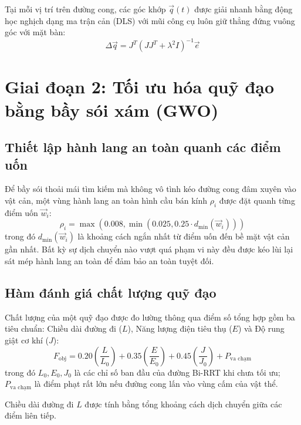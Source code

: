 Tại mỗi vị trí trên đường cong, các góc khớp $\vec{q}(t)$ được giải nhanh bằng động học nghịch dạng ma trận cản (DLS) với mũi công cụ luôn giữ thẳng đứng vuông góc với mặt bàn:
\begin{equation}
    \Delta \vec{q} = J^T \left( J J^T + \lambda^2 I \right)^{-1} \vec{e}
\end{equation}

\section{Giai đoạn 2: Tối ưu hóa quỹ đạo bằng bầy sói xám (GWO)}
\label{sec:stage2_gwo}

\subsection{Thiết lập hành lang an toàn quanh các điểm uốn}

Để bầy sói thoải mái tìm kiếm mà không vô tình kéo đường cong đâm xuyên vào vật cản, một vùng hành lang an toàn hình cầu bán kính $\rho_i$ được đặt quanh từng điểm uốn $\vec{w}_i$:
\begin{equation}
    \rho_i = \max\left( 0.008, \min\left( 0.025, 0.25 \cdot d_{\min}(\vec{w}_i) \right) \right)
\end{equation}
trong đó $d_{\min}(\vec{w}_i)$ là khoảng cách ngắn nhất từ điểm uốn đến bề mặt vật cản gần nhất. Bất kỳ sự dịch chuyển nào vượt quá phạm vi này đều được kéo lùi lại sát mép hành lang an toàn để đảm bảo an toàn tuyệt đối.

\subsection{Hàm đánh giá chất lượng quỹ đạo}

Chất lượng của một quỹ đạo được đo lường thông qua điểm số tổng hợp gồm ba tiêu chuẩn: Chiều dài đường đi ($L$), Năng lượng điện tiêu thụ ($E$) và Độ rung giật cơ khí ($J$):
\begin{equation}
    F_{\text{obj}} = 0.20 \left(\frac{L}{L_0}\right) + 0.35 \left(\frac{E}{E_0}\right) + 0.45 \left(\frac{J}{J_0}\right) + P_{\text{va chạm}}
\end{equation}
trong đó $L_0, E_0, J_0$ là các chỉ số ban đầu của đường Bi-RRT khi chưa tối ưu; $P_{\text{va chạm}}$ là điểm phạt rất lớn nếu đường cong lấn vào vùng cấm của vật thể.

Chiều dài đường đi $L$ được tính bằng tổng khoảng cách dịch chuyển giữa các điểm liên tiếp.


